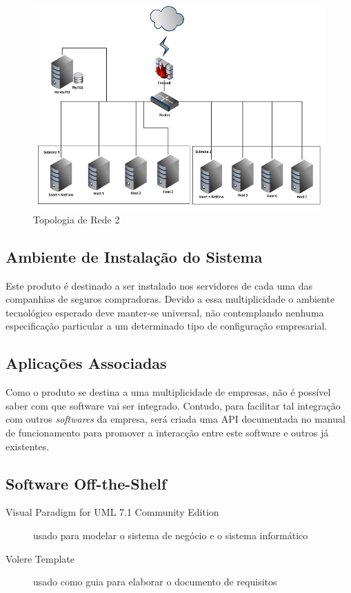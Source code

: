 \begin{figure}
	\centering	
	\includegraphics[scale=0.6]{images/topologia3.png}
	\caption{Topologia de Rede 2}
    \label{img:topo2}
\end{figure}


\subsection{Ambiente de Instalação do Sistema}


Este produto é destinado a ser instalado nos servidores de cada uma das companhias de seguros compradoras. Devido a essa multiplicidade o ambiente tecnológico esperado deve manter-se universal, não contemplando nenhuma especificação particular a um determinado tipo de configuração empresarial.

\subsection{Aplicações Associadas}
Como o produto se destina a uma multiplicidade de empresas, não é possível saber com que software vai ser integrado. Contudo, para facilitar tal integração com outros \emph{softwares} da empresa, será criada uma API documentada no manual de funcionamento para promover a interacção entre este software e outros já existentes.

\subsection{Software Off-the-Shelf}
\begin{description}
    \item [Visual Paradigm for UML 7.1 Community Edition] usado para modelar o sistema de negócio e o sistema informático
    \item [Volere Template] usado como guia para elaborar o documento de requisitos

\end{description}

